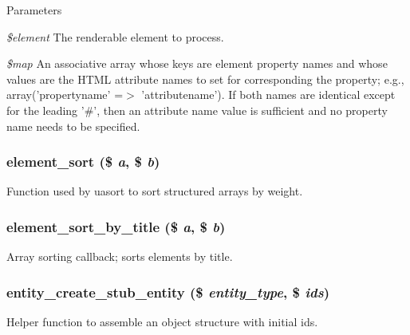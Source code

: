 \begin{DoxyParams}{Parameters}
\item[{\em \$element}]The renderable element to process. \item[{\em \$map}]An associative array whose keys are element property names and whose values are the HTML attribute names to set for corresponding the property; e.g., array('propertyname' =$>$ 'attributename'). If both names are identical except for the leading '\#', then an attribute name value is sufficient and no property name needs to be specified. \end{DoxyParams}
\hypertarget{common_8inc_a61f0cc62072ab44aa349478fb7219c74}{
\subsubsection[{element\_\-sort}]{\setlength{\rightskip}{0pt plus 5cm}element\_\-sort (\$ {\em a}, \/  \$ {\em b})}}
\label{common_8inc_a61f0cc62072ab44aa349478fb7219c74}
Function used by uasort to sort structured arrays by weight. \hypertarget{common_8inc_af8b5e243059cba2c266cad6c94712190}{
\subsubsection[{element\_\-sort\_\-by\_\-title}]{\setlength{\rightskip}{0pt plus 5cm}element\_\-sort\_\-by\_\-title (\$ {\em a}, \/  \$ {\em b})}}
\label{common_8inc_af8b5e243059cba2c266cad6c94712190}
Array sorting callback; sorts elements by title. \hypertarget{common_8inc_af0b338fb292ad46545a3d35178a0155b}{
\subsubsection[{entity\_\-create\_\-stub\_\-entity}]{\setlength{\rightskip}{0pt plus 5cm}entity\_\-create\_\-stub\_\-entity (\$ {\em entity\_\-type}, \/  \$ {\em ids})}}
\label{common_8inc_af0b338fb292ad46545a3d35178a0155b}
Helper function to assemble an object structure with initial ids.

